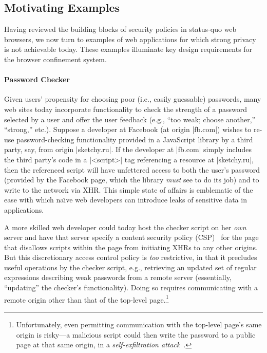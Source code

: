 
\subsection{Motivating Examples}
\label{sec:motivating-examples}

Having reviewed the building blocks of security policies in status-quo
web browsers, we now turn to examples of web applications for which
strong privacy is not achievable today. %
These examples
illuminate key design requirements for the \sys{} browser confinement
system. %

\paragraph{Password Checker} Given users' propensity for choosing poor
(i.e., easily guessable) passwords, many web sites today incorporate
functionality to check the strength of a password selected by a user
and offer the user feedback (e.g., ``too weak; choose another,''
``strong,'' etc.). Suppose a developer at Facebook (at origin
\js|fb.com|) wishes to re-use password-checking functionality provided
in a JavaScript library by a third party, say, from origin
\js|sketchy.ru|. If the developer at \js|fb.com| simply includes the
third party's code in a \js|<script>| tag referencing a resource at
\js|sketchy.ru|, then the referenced script will have unfettered
access to both the user's password (provided by the Facebook page,
which the library {\em must} see to do its job) and to write to the
network via XHR. This simple state of affairs is emblematic of the
ease with which na\"{\i}ve web developers can introduce leaks of
sensitive data in applications.

A more skilled web developer could today host the checker script on
her {\em own} server and have that server specify a content security
policy (CSP)~\cite{csp} for the page that disallows scripts within the
page from initiating XHRs to any other origins. But this discretionary
access control policy is {\em too} restrictive, in that it precludes
useful operations by the checker script, e.g., retrieving an updated
set of regular expressions describing weak passwords from a remote
server (essentially, ``updating'' the checker's functionality). Doing
so requires communicating with a remote origin other than that of the
top-level page.\footnote{Unfortunately, even permitting communication
  with the top-level page's same origin is risky---a malicious script
  could then write the password to a public page at that same origin,
  in a {\em self-exfiltration attack}~\cite{Yip:2009:PBS,selfex}.}

